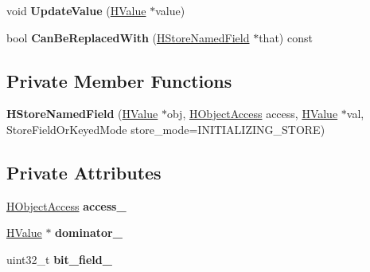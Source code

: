 \begin{DoxyCompactItemize}
\item 
void {\bfseries Update\+Value} (\hyperlink{classv8_1_1internal_1_1_h_value}{H\+Value} $\ast$value)\hypertarget{classv8_1_1internal_1_1_h_store_named_field_ad6e9397e9078847810f74a95ef25939a}{}\label{classv8_1_1internal_1_1_h_store_named_field_ad6e9397e9078847810f74a95ef25939a}

\item 
bool {\bfseries Can\+Be\+Replaced\+With} (\hyperlink{classv8_1_1internal_1_1_h_store_named_field}{H\+Store\+Named\+Field} $\ast$that) const \hypertarget{classv8_1_1internal_1_1_h_store_named_field_a0178b6fbfeba88ade4deed833623d7ef}{}\label{classv8_1_1internal_1_1_h_store_named_field_a0178b6fbfeba88ade4deed833623d7ef}

\end{DoxyCompactItemize}
\subsection*{Private Member Functions}
\begin{DoxyCompactItemize}
\item 
{\bfseries H\+Store\+Named\+Field} (\hyperlink{classv8_1_1internal_1_1_h_value}{H\+Value} $\ast$obj, \hyperlink{classv8_1_1internal_1_1_h_object_access}{H\+Object\+Access} access, \hyperlink{classv8_1_1internal_1_1_h_value}{H\+Value} $\ast$val, Store\+Field\+Or\+Keyed\+Mode store\+\_\+mode=I\+N\+I\+T\+I\+A\+L\+I\+Z\+I\+N\+G\+\_\+\+S\+T\+O\+RE)\hypertarget{classv8_1_1internal_1_1_h_store_named_field_abd922e4e2169b5f0042e162f9aec5088}{}\label{classv8_1_1internal_1_1_h_store_named_field_abd922e4e2169b5f0042e162f9aec5088}

\end{DoxyCompactItemize}
\subsection*{Private Attributes}
\begin{DoxyCompactItemize}
\item 
\hyperlink{classv8_1_1internal_1_1_h_object_access}{H\+Object\+Access} {\bfseries access\+\_\+}\hypertarget{classv8_1_1internal_1_1_h_store_named_field_affdb192f60a46dd34d475aecebb63ff8}{}\label{classv8_1_1internal_1_1_h_store_named_field_affdb192f60a46dd34d475aecebb63ff8}

\item 
\hyperlink{classv8_1_1internal_1_1_h_value}{H\+Value} $\ast$ {\bfseries dominator\+\_\+}\hypertarget{classv8_1_1internal_1_1_h_store_named_field_a5b0c38880fa7522c172f6aa1e5919da0}{}\label{classv8_1_1internal_1_1_h_store_named_field_a5b0c38880fa7522c172f6aa1e5919da0}

\item 
uint32\+\_\+t {\bfseries bit\+\_\+field\+\_\+}\hypertarget{classv8_1_1internal_1_1_h_store_named_field_a92b03273766e5ee2af3638fe042ec989}{}\label{classv8_1_1internal_1_1_h_store_named_field_a92b03273766e5ee2af3638fe042ec989}

\end{DoxyCompactItemize}
